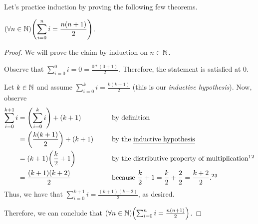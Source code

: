 \newpage

Let's practice induction by proving the following few theorems.

\begin{example}\label{thm:gaussiansum}
    $\displaystyle \pn*{\forall n \in \N}\pn*{\sum_{i = 0}^{n}i = \frac{n(n + 1)}{2}}$.
\end{example}
\begin{proof}
    We will prove the claim by induction on $n \in \mathbb{N}$.
    \begin{case}
        Observe that $\displaystyle \sum_{i = 0}^{0}i = 0 = \frac{0*(0 + 1)}{2}$.
        Therefore, the statement is satisfied at $0$.
    \end{case}
    \begin{case}
        Let $k \in \mathbb{N}$ and assume $\displaystyle \sum_{i = 0}^{k}i = \frac{k(k + 1)}{2}$
        (this is our \emph{inductive hypothesis}).
        Now, observe
        \begin{alignat*}{2}
            \sum_{i = 0}^{k + 1}i &= \pn*{\sum_{i = 0}^{k}i} + (k + 1) &&\text{ by definition}\\
                                  &= \pn*{\frac{k(k + 1)}{2}} + (k + 1)~~~~&&\text{ by the \emph{inductive hypothesis}}\\
                                  &= (k + 1)\pn*{\frac{k}{2} + 1} &&\text{ by the distributive property of multiplication}\footnotemark[1]\footnotemark[2]\\
                                  &= \frac{(k + 1)(k + 2)}{2} &&\text{ because } \frac{k}{2} + 1 = \frac{k}{2} + \frac{2}{2} = \frac{k + 2}{2}.\footnotemark[2]\footnotemark[3]
        \end{alignat*}
        Thus, we have that $\displaystyle \sum_{i = 0}^{k + 1}i = \frac{(k + 1)(k + 2)}{2}$, as desired.
    \end{case}
    Therefore, we can conclude that $\pn*{\forall n \in \N}\pn*{\sum_{i = 0}^{n}i = \frac{n(n + 1)}{2}}$.
\end{proof}

